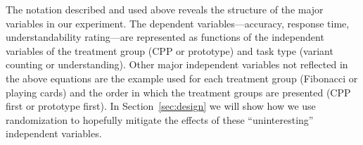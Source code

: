 \documentclass[11pt]{article}
\begin{document}
	The notation described and used above reveals the structure of the major
	variables in our experiment.  The dependent variables---accuracy, response
	time, understandability rating---are represented as functions of the
	independent variables of the treatment group (CPP or prototype) and task type
	(variant counting or understanding).  Other major independent variables not
	reflected in the above equations are the example used for each treatment group
	(Fibonacci or playing cards) and the order in which the treatment groups are
	presented (CPP first or prototype first).  In Section~\ref{sec:design} we will
	show how we use randomization to hopefully mitigate the effects of these
	``uninteresting'' independent variables.
	
	
\end{document}
